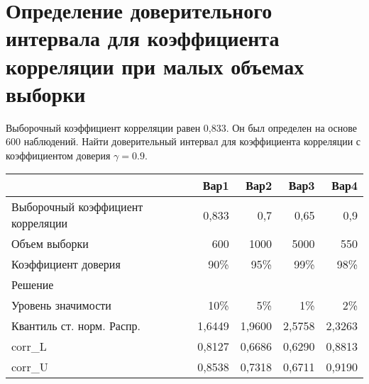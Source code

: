 \documentclass[12pt,a4paper]{article}
\begin{document}
\section{Определение доверительного интервала для коэффициента корреляции при малых объемах выборки}
\begin{taskrus}
Выборочный коэффициент корреляции равен 0,833. Он был определен на основе 600 наблюдений. Найти доверительный интервал для коэффициента корреляции с коэффициентом доверия $\gamma=0.9$.

\begin{table}[H]
  \centering
    \begin{tabular}{lrrrr}
    \toprule
          & Вар1  & Вар2  & Вар3  & Вар4 \\
    \midrule
    Выборочный коэффициент корреляции & 0,833 & 0,7   & 0,65  & 0,9 \\
    Объем выборки & 600   & 1000  & 5000  & 550 \\
    Коэффициент доверия & 90\%  & 95\%  & 99\%  & 98\% \\
    Решение &       &       &       &  \\
    Уровень значимости & 10\%  & 5\%   & 1\%   & 2\% \\
    Квантиль ст. норм. Распр. & 1,6449 & 1,9600 & 2,5758 & 2,3263 \\
    corr\_L & 0,8127 & 0,6686 & 0,6290 & 0,8813 \\
    corr\_U & 0,8538 & 0,7318 & 0,6711 & 0,9190 \\
    \bottomrule
    \end{tabular}%
  \label{tab:addlabel}%
\end{table}%

\end{taskrus}
\pagebreak
\end{document}
